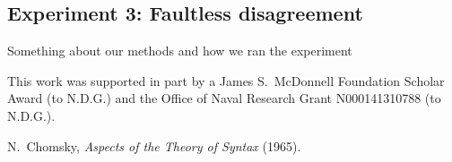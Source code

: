 \documentclass{pnastwo}
\begin{document}
\begin{article}
\begin{materials}
\section{Experiment 3: Faultless disagreement}
Something about our methods and how we ran the experiment


\begin{table}[t]
	\caption{Adjectives and their semantic classes tested in all experiments, and nouns and their classes tested in the behavioral experiments.}\label{stim-table}
\end{table}


\end{materials}


\begin{acknowledgments}
This work was supported in part by a James S.~McDonnell Foundation Scholar Award (to N.D.G.) and the Office of Naval Research Grant N000141310788 (to N.D.G.).
\end{acknowledgments}

\begin{thebibliography}{10}
	N.~Chomsky, {\em Aspects of the Theory of Syntax} (1965).


\end{thebibliography}
\end{article}
\end{document}

